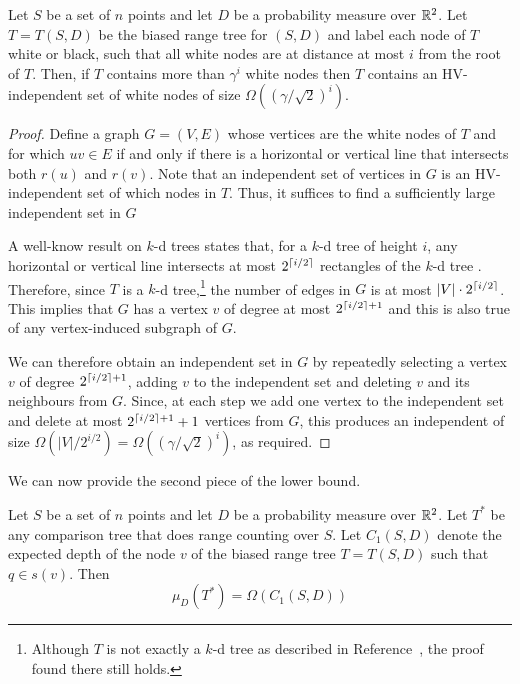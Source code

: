 \documentclass[lotsofwhite,charterfonts]{patmorin}
\begin{document}
\begin{lem}
Let $S$ be a set of $n$ points and let $D$ be a probability measure
over $\mathbb{R}^2$.
Let $T=T(S,D)$ be the biased range tree for $(S,D)$ and label
each node of $T$ white
or black, such that all white nodes are at distance at most $i$ from
the root of $T$.  Then, if $T$ contains more than $\gamma^i$ white nodes
then $T$ contains an HV-independent set of white nodes of size
$\Omega((\gamma/\sqrt{2})^i)$.
\end{lem}

\begin{proof}
Define a graph $G=(V,E)$ whose vertices are the white nodes of $T$ and
for which $uv\in E$ if and only if there is a horizontal or vertical line that
intersects both $r(u)$ and $r(v)$.  Note that an independent set of
vertices in $G$ is an HV-independent set of which nodes in $T$.  Thus,
it suffices to find a sufficiently large independent set in $G$

A well-know result on $k$-d trees states that, for a $k$-d tree of
height $i$, any horizontal or vertical line intersects at most
$2^{\left\lceil i/2 \right\rceil}$ rectangles of the $k$-d tree \cite{bkos97}.
Therefore, since $T$ is a $k$-d tree,\footnote{Although $T$ is not
exactly a $k$-d tree as described in Reference~\cite{bkos97}, the
proof found there still holds.} the number of edges in $G$ is at most
$|V|\cdot 2^{\left\lceil i/2 \right\rceil}$.  This implies that $G$ has a vertex $v$ of
degree at most $2^{\left\lceil i/2 \right\rceil+1}$ and this is also true of any
vertex-induced subgraph of $G$.

We can therefore obtain an independent set in $G$ by repeatedly
selecting a vertex $v$ of degree $2^{\left\lceil i/2 \right\rceil+1}$, adding $v$ to the
independent set and deleting $v$ and its neighbours from $G$.  Since, at
each step we add one vertex to the independent set and delete at most
$2^{\left\lceil i/2 \right\rceil+1}+1$ vertices from $G$, this produces an independent of size
$\Omega(|V|/2^{i/2}) = \Omega((\gamma/\sqrt{2})^i)$, as required.
\end{proof}

We can now provide the second piece of the lower bound.

\begin{lem}
Let $S$ be a set of $n$ points and let $D$ be a probability measure
over $\mathbb{R}^2$.
Let $T^*$ be any comparison tree that does range counting over $S$. Let
$C_1(S,D)$ denote the expected depth of the node $v$ of the biased
range tree $T=T(S,D)$ such that $q\in s(v)$.  Then
\[
    \mu_D(T^*) = \Omega(C_1(S,D))
\]
\end{lem}
\end{document}
